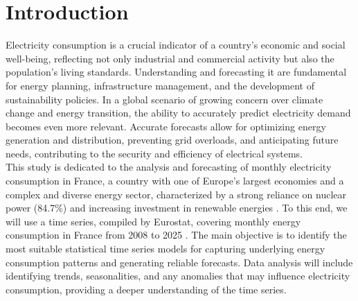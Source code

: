 \section{Introduction}

Electricity consumption is a crucial indicator of a country's economic and social well-being, reflecting not only industrial and commercial activity but also the population's living standards. Understanding and forecasting it are fundamental for energy planning, infrastructure management, and the development of sustainability policies. In a global scenario of growing concern over climate change and energy transition, the ability to accurately predict electricity demand becomes even more relevant. Accurate forecasts allow for optimizing energy generation and distribution, preventing grid overloads, and anticipating future needs, contributing to the security and efficiency of electrical systems.\\

This study is dedicated to the analysis and forecasting of monthly electricity consumption in France, a country with one of Europe's largest economies and a complex and diverse energy sector, characterized by a strong reliance on nuclear power (84.7\%) and increasing investment in renewable energies \cite{EDF2012}. To this end, we will use a time series, compiled by Eurostat, covering monthly energy consumption in France from 2008 to 2025 \cite{EurostatElectricityConsumption}. The main objective is to identify the most suitable statistical time series models for capturing underlying energy consumption patterns and generating reliable forecasts. Data analysis will include identifying trends, seasonalities, and any anomalies that may influence electricity consumption, providing a deeper understanding of the time series.